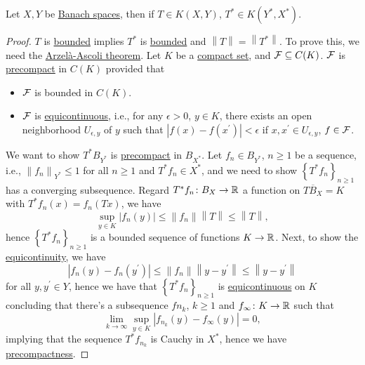 \begin{theorem}[Schauder]\label{thm:Schauder}
	Let \(X, Y\) be \hyperref[def:Banach-space]{Banach spaces}, then if \(T\in K(X, Y)\), \(T^{\ast} \in K(Y^{\ast} , X^{\ast} )\).
\end{theorem}
\begin{proof}
	\(T\) is \hyperref[def:bounded-map]{bounded} implies \(T^{\ast} \) is \hyperref[def:bounded-map]{bounded} and \(\left\lVert T\right\rVert = \left\lVert T^{\ast} \right\rVert \). To prove this, we need the \hyperref[thm:Arzela-Ascoli]{Arzelà-Ascoli theorem}. Let \(K\) be a \hyperref[def:compact]{compact set}, and \(\mathcal{\MakeUppercase{f}} \subseteq C(K)\). \(\mathcal{\MakeUppercase{f}} \) is \hyperref[def:precompact]{precompact} in \(C(K)\) provided that
	\begin{itemize}
		\item \(\mathcal{\MakeUppercase{f}} \) is bounded in \(C(K)\).
		\item \(\mathcal{\MakeUppercase{f}} \) is \hyperref[def:equicontinuous]{equicontinuous}, i.e., for any \(\epsilon >0\), \(y\in K\), there exists an open neighborhood \(U_{\epsilon , y}\) of \(y\) such that \(\left\vert f(x) - f(x^\prime ) \right\vert< \epsilon \) if \(x, x^\prime \in U_{\epsilon , y}\), \(f\in \mathcal{\MakeUppercase{f}} \).
	\end{itemize}
	We want to show \(T^{\ast} B_{Y^{\ast} }\) is \hyperref[def:precompact]{precompact} in \(B_{X^{\ast} }\). Let \(f_{n} \in B_{Y^{\ast} }\), \(n \geq 1\) be a sequence, i.e., \(\left\lVert f_n \right\rVert _{Y^{\ast} } \leq 1\) for all \(n\geq 1\) and \(T^{\ast} f_{n} \in X^{\ast} \), and we need to show \(\left\{ T^{\ast} f_n \right\}_{n\geq 1} \) has a converging subsequence. Regard \(T^{\ast} f_{n} \colon B_X \to \mathbb{\MakeUppercase{r}} \) a function on \(\overline{TB_{X} } = K\) with \(T^{\ast} f_{n} (x) = f_{n} (Tx)\), we have
	\[
		\sup _{y\in K} \left\vert f_{n} (y) \right\vert \leq \left\lVert f_{n} \right\rVert \left\lVert T\right\rVert \leq \left\lVert T\right\rVert,
	\]
	hence \(\left\{ T^{\ast} f_{n}  \right\}_{n\geq 1} \) is a bounded sequence of functions \(K\to \mathbb{\MakeUppercase{r}} \). Next, to show the \hyperref[def:equicontinuous]{equicontinuity}, we have
	\[
		\left\vert f_{n} (y) - f_{n} (y^\prime ) \right\vert
		\leq \left\lVert f_{n} \right\rVert \left\lVert y-y^\prime \right\rVert
		\leq \left\lVert y - y^\prime \right\rVert
	\]
	for all \(y, y^\prime \in Y\), hence we have that \(\left\{ T^{\ast} f_{n}  \right\}_{n\geq 1} \) is \hyperref[def:equicontinuous]{equicontinuous} on \(K\) concluding that there's a subsequence \(f{n_{k} }\), \(k \geq 1\) and \(f_{\infty }\colon K\to \mathbb{\MakeUppercase{r}} \) such that
	\[
		\lim_{k \to \infty} \sup _{y\in K}\left\vert f_{n_{k} } (y) - f_\infty (y) \right\vert = 0 ,
	\]
	implying that the sequence \(T^{\ast} f_{n_{k} }\) is Cauchy in \(X^{\ast} \), hence we have \hyperref[def:precompact]{precompactness}.
\end{proof}
